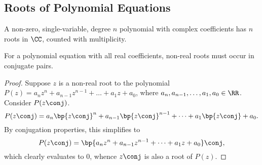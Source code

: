 \subsection{Roots of Polynomial Equations}

\begin{theorem}
    A non-zero, single-variable, degree $n$ polynomial with complex coefficients has $n$ roots in $\CC$, counted with multiplicity.
\end{theorem}

\begin{theorem}
    For a polynomial equation with all real coefficients, non-real roots must occur in conjugate pairs.
\end{theorem}
\begin{proof}
    Suppose $z$ is a non-real root to the polynomial $P(z) = a_n z^n + a_{n-1} z^{n-1} + \dots + a_1 z + a_0$, where $a_n, a_{n-1}, \dots, a_1, a_0 \in \RR$. Consider $P(z\conj)$. \[P(z\conj) = a_n \bp{z\conj}^n + a_{n-1} \bp{z\conj}^{n-1} + \dots + a_1 \bp{z\conj} + a_0.\] By conjugation properties, this simplifies to \[P(z\conj) = \bp{a_n z^n + a_{n-1} z^{n-1} + \dots + a_1 z + a_0}\conj,\] which clearly evaluates to 0, whence $z\conj$ is also a root of $P(z)$.
\end{proof}